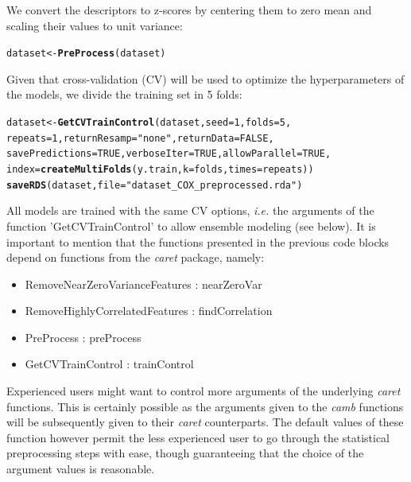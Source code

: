 \documentclass[twoside,a4wide,12pt]{article}\usepackage[]{graphicx}\usepackage[]{color}
\makeatletter
\newcommand{\hlnum}[1]{\textcolor[rgb]{0.686,0.059,0.569}{#1}}%
\newcommand{\hlstr}[1]{\textcolor[rgb]{0.192,0.494,0.8}{#1}}%
\newcommand{\hlstd}[1]{\textcolor[rgb]{0.345,0.345,0.345}{#1}}%
\newcommand{\hlkwb}[1]{\textcolor[rgb]{0.69,0.353,0.396}{#1}}%
\newcommand{\hlkwc}[1]{\textcolor[rgb]{0.333,0.667,0.333}{#1}}%
\newcommand{\hlkwd}[1]{\textcolor[rgb]{0.737,0.353,0.396}{\textbf{#1}}}%
\newenvironment{kframe}{%
 \def\at@end@of@kframe{}%
 \ifinner\ifhmode%
  \def\at@end@of@kframe{\end{minipage}}%
  \begin{minipage}{\columnwidth}%
 \fi\fi%
 \def\FrameCommand##1{\hskip\@totalleftmargin \hskip-\fboxsep
 \colorbox{shadecolor}{##1}\hskip-\fboxsep
     \hskip-\linewidth \hskip-\@totalleftmargin \hskip\columnwidth}%
 \MakeFramed {\advance\hsize-\width
   \@totalleftmargin\z@ \linewidth\hsize
   \@setminipage}}%
 {\par\unskip\endMakeFramed%
 \at@end@of@kframe}
\newenvironment{knitrout}{}{} %
\makeatother
\begin{document}
We convert the descriptors to z-scores by centering them to zero mean and scaling their values to unit variance:
\begin{knitrout}
\color{fgcolor}\begin{kframe}
\begin{alltt}
\hlstd{dataset} \hlkwb{<-} \hlkwd{PreProcess}\hlstd{(dataset)}
\end{alltt}
\end{kframe}
\end{knitrout}


Given that cross-validation (CV) will be used to optimize the hyperparameters of the models, we divide the training set in 5 folds:
\begin{knitrout}
\color{fgcolor}\begin{kframe}
\begin{alltt}
\hlstd{dataset} \hlkwb{<-} \hlkwd{GetCVTrainControl}\hlstd{(dataset,} \hlkwc{seed} \hlstd{=} \hlnum{1}\hlstd{,} \hlkwc{folds} \hlstd{=} \hlnum{5}\hlstd{,}
    \hlkwc{repeats} \hlstd{=} \hlnum{1}\hlstd{,} \hlkwc{returnResamp} \hlstd{=} \hlstr{"none"}\hlstd{,} \hlkwc{returnData} \hlstd{=} \hlnum{FALSE}\hlstd{,}
    \hlkwc{savePredictions} \hlstd{=} \hlnum{TRUE}\hlstd{,} \hlkwc{verboseIter} \hlstd{=} \hlnum{TRUE}\hlstd{,} \hlkwc{allowParallel} \hlstd{=} \hlnum{TRUE}\hlstd{,}
    \hlkwc{index} \hlstd{=} \hlkwd{createMultiFolds}\hlstd{(y.train,} \hlkwc{k} \hlstd{= folds,} \hlkwc{times} \hlstd{= repeats))}
\hlkwd{saveRDS}\hlstd{(dataset,} \hlkwc{file} \hlstd{=} \hlstr{"dataset_COX_preprocessed.rda"}\hlstd{)}
\end{alltt}
\end{kframe}
\end{knitrout}

All models are trained with the same CV options, {\it i.e.} the arguments of the function 'GetCVTrainControl' to allow ensemble modeling (see below).
It is important to mention that the functions presented in the previous code blocks depend on functions from the {\it caret} package, namely: 
\begin{itemize}
\item RemoveNearZeroVarianceFeatures : nearZeroVar
\item RemoveHighlyCorrelatedFeatures : findCorrelation
\item PreProcess : preProcess
\item GetCVTrainControl : trainControl
\end{itemize}
Experienced users might want to control more arguments of the underlying {\it caret} functions.
This is certainly possible as the arguments given to the {\it camb} functions will be subsequently given to their {\it caret} counterparts.
The default values of these function however permit the less experienced user to go through the statistical preprocessing steps with ease, though guaranteeing that the choice of the argument values is reasonable.
\end{document}
